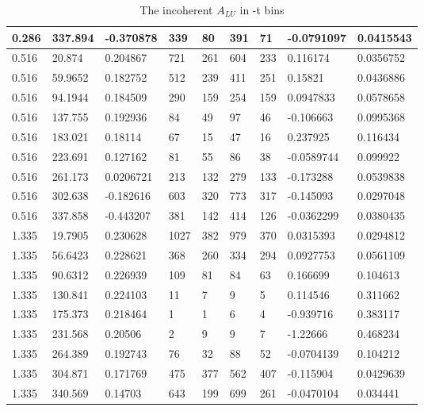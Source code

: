 \documentclass[12pt]{article}
\begin{document}
\begin{table}[!h]
\begin{center}
\begin{tabular}{||l|l|l|l|l|l|l|l|l||}
0.286    &337.894    &-0.370878    &339    &80   &391   &71    &-0.0791097    &0.0415543\\
\hline
0.516    &20.874    &0.204867    &721    &261   &604   &233    &0.116174    &0.0356752\\
0.516    &59.9652    &0.182752    &512    &239   &411   &251    &0.15821    &0.0436886\\
0.516    &94.1944    &0.184509    &290    &159   &254   &159    &0.0947833    &0.0578658\\
0.516    &137.755    &0.192936    &84    &49   &97   &46    &-0.106663    &0.0995368\\
0.516    &183.021    &0.18114    &67    &15   &47   &16    &0.237925    &0.116434\\
0.516    &223.691    &0.127162    &81    &55   &86   &38    &-0.0589744    &0.099922\\
0.516    &261.173    &0.0206721    &213    &132   &279   &133    &-0.173288    &0.0539838\\
0.516    &302.638    &-0.182616    &603    &320   &773   &317    &-0.145093    &0.0297048\\
0.516    &337.858    &-0.443207    &381    &142   &414   &126    &-0.0362299    &0.0380435\\
\hline
1.335    &19.7905    &0.230628    &1027    &382   &979   &370    &0.0315393    &0.0294812\\
1.335    &56.6423    &0.228621    &368    &260   &334   &294    &0.0927753    &0.0561109\\
1.335    &90.6312    &0.226939    &109    &81   &84   &63    &0.166699    &0.104613\\
1.335    &130.841    &0.224103    &11    &7   &9   &5    &0.114546    &0.311662\\
1.335    &175.373    &0.218464    &1    &1   &6   &4    &-0.939716    &0.383117\\
1.335    &231.568    &0.20506    &2    &9   &9   &7    &-1.22666    &0.468234\\
1.335    &264.389    &0.192743    &76    &32   &88   &52    &-0.0704139    &0.104212\\
1.335    &304.871    &0.171769    &475    &377   &562   &407    &-0.115904    &0.0429639\\
1.335    &340.569    &0.14703    &643    &199   &699   &261    &-0.0470104    &0.034441\\


 \hline
 \hline
 \end{tabular}
 \caption{The incoherent $A_{LU}$ in -t bins}
 \label{table:InCoh_t_BSA}
 \end{center}
\end{table}
\end{document}
